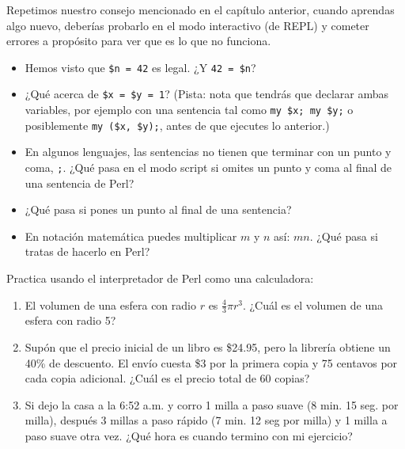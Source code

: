 \begin{exercise}

Repetimos nuestro consejo mencionado en el capítulo anterior,
cuando aprendas algo nuevo, deberías probarlo en el modo interactivo
(de REPL) y cometer errores a propósito para ver que es lo que no funciona.

\begin{itemize}

\item Hemos visto que {\tt \$n = 42} es legal. ¿Y {\tt 42 = \$n}?

\item ¿Qué acerca de {\tt \$x = \$y = 1}? (Pista: nota que 
tendrás que declarar ambas variables, por ejemplo con una sentencia
tal como {\tt my \$x; my \$y;} o posiblemente {\tt my (\$x, \$y);},
antes de que ejecutes lo anterior.)

\item En algunos lenguajes, las sentencias no tienen que terminar con un
punto y coma, {\tt ;}. ¿Qué pasa en el modo script si omites un punto y
coma al final de una sentencia de Perl?

\item ¿Qué pasa si pones un punto al final de una sentencia?

\item En notación matemática puedes multiplicar $m$ y $n$ así: $m n$.
¿Qué pasa si tratas de hacerlo en Perl?

\end{itemize}

\end{exercise}


\begin{exercise}

Practica usando el interpretador de Perl como una calculadora:

\begin{enumerate}

\item El volumen de una esfera con radio $r$ es $\frac{4}{3} \pi r^3$.
¿Cuál es el volumen de una esfera con radio 5?

\item Supón que el precio inicial de un libro es \$24.95,
pero la librería obtiene un 40\% de descuento. El envío
cuesta \$3 por la primera copia y 75 centavos por cada copia adicional.
¿Cuál es el precio total de 60 copias?

\item Si dejo la casa a la 6:52 a.m. y corro 1 milla a paso suave
(8 min. 15 seg. por milla), después 3 millas a paso rápido 
(7 min. 12 seg por milla) y 1 milla a paso suave otra vez.
¿Qué hora es cuando termino con mi ejercicio?

\end{enumerate}
\end{exercise}

